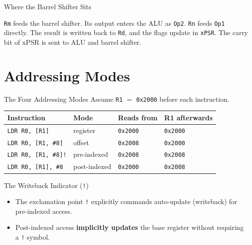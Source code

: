 \documentclass[9pt,aspectratio=169,xcolor=table]{beamer}
\newcommand{\striped}{\rowcolors{1}{white}{stripe}}
\begin{document}
\begin{frame}[plain]{Where the Barrel Shifter Sits}
\begin{center}
{\begin{tikzpicture}[xscale=0.11,yscale=-0.11]
			\end{tikzpicture}%
		}
	\end{center}
	\vspace{1mm}
	{\small\centering \texttt{Rm} feeds the barrel shifter. Its output
		enters the ALU as \texttt{Op2}. \texttt{Rn} feeds \texttt{Op1}
		directly. The result is written back to \texttt{Rd}, and the flags
		update in \texttt{xPSR}. The carry bit of xPSR is sent to ALU and barrel shifter.\par}
\end{frame}

\section{Addressing Modes}

\begin{frame}{The Four Addressing Modes}
    \leavevmode
    Assume \texttt{R1} $=$ \texttt{0x2000} before each instruction.

    \vspace{3mm}
    \begin{center}
    {\small
    \striped
    \begin{tabular}{@{}l l l l@{}}
        \toprule
        \textbf{Instruction} & \textbf{Mode} & \textbf{Reads from} & \textbf{R1 afterwards} \\
        \midrule
        \texttt{LDR R0, [R1]}       & register     & \texttt{0x2000} & \texttt{0x2000} \\
        \texttt{LDR R0, [R1, \#8]}  & offset       & \texttt{0x2008} & \texttt{0x2000} \\
        \texttt{LDR R0, [R1, \#8]!} & pre-indexed  & \texttt{0x2008} & \alert{\texttt{0x2008}} \\
        \texttt{LDR R0, [R1], \#8}  & post-indexed & {\texttt{0x2000}} & \alert{\texttt{0x2008}} \\
        \bottomrule
    \end{tabular}}
    \end{center}

    \vspace{3mm}
  \begin{block}{The Writeback Indicator (\texttt{!})}
	\begin{itemize}
		\item The exclamation point \texttt{!} explicitly commands auto-update (writeback) for pre-indexed access.
		\item Post-indexed access \textbf{implicitly updates} the base register without requiring a \texttt{!} symbol.
	\end{itemize}
\end{block}
\end{frame}
\end{document}
